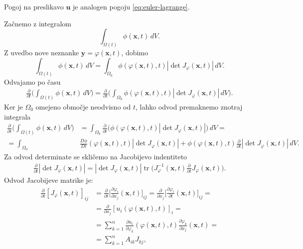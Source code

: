 \documentclass[mat2, tisk]{fmfdelo}
\newcommand{\bd}{\textbf}
\begin{document}
\begin{opomba}
Pogoj na preslikavo $\bd{u}$ je analogen pogoju \eqref{eq:euler-lagrange}.
\end{opomba}

\begin{dokaz}
Začnemo z integralom 
$$
\int_{\Omega(t)} \phi(\mathbf{x},t)\, dV.
$$
Z uvedbo nove neznanke $\bd{y} = \varphi(\bd{x}, t)$, dobimo 
$$
\int_{\Omega(t)} \phi(\mathbf{x},t)\, dV = \int_{\Omega_0} \phi(\varphi({\mathbf{x}},t), t) |\det{J_\varphi(\bd{x}, t)}| \, dV.
$$
Odvajamo po času 
\begin{align*}
\frac{\partial}{\partial t} \Big(\int_{\Omega(t)} \phi(\mathbf{x},t)\, dV\Big) = \frac{\partial}{\partial t} \Big(\int_{\Omega_0} \phi(\varphi({\mathbf{x}},t), t) |\det{J_\varphi(\bd{x}, t)}| \, dV \Big).
\end{align*}
Ker je $\Omega_0$ omejeno območje neodvisno od $t$, lahko odvod premaknemo 
znotraj integrala
\begin{align*}
\frac{\partial}{\partial t} \Big(\int_{\Omega(t)} \phi(\mathbf{x},t)\, dV\Big) &= \int_{\Omega_0} \frac{\partial}{\partial t} \Big(\phi(\varphi({\mathbf{x}},t), t) |\det{J_\varphi(\bd{x}, t)}|\Big) \, dV = \\
= \int_{\Omega_0} &\frac{D \phi}{D t}(\varphi(\bd{x}, t), t) |\det J_\varphi(\bd{x}, t)| + \phi(\varphi({\mathbf{x}},t), t) \frac{\partial}{\partial t} |\det{J_\varphi(\bd{x}, t)}| \, dV.
\end{align*}
Za odvod determinate se skličemo na Jacobijevo indentiteto 
\begin{align*}
\frac{\partial}{\partial t} |\det{J_\varphi(\bd{x}, t)}| = |\det{J_\varphi(\bd{x}, t)}| \operatorname{tr}\Big(J_\varphi^{-1}(\bd{x}, t) \frac{\partial}{\partial t} J_\varphi(\bd{x}, t)\Big).
\end{align*}
Odvod Jacobijeve matrike je:
\begin{align*}
\frac{\partial}{\partial t} [J_\varphi(\bd{x}, t)]_{ij} &= \frac{\partial}{\partial t} \Big[\frac{\partial \varphi_i}{\partial x_j}(\bd{x}, t)\Big]_{ij} = \frac{\partial}{\partial x_j} \Big[\frac{\partial \varphi_i}{\partial t}(\bd{x}, t)\Big]_{ij} = \\
&= \frac{\partial}{\partial x_j} [u_i(\varphi(\bd{x}, t), t)]_i = \\
&= \sum_{k=1}^n \frac{\partial u_i}{\partial \varphi_k}(\varphi(\bd{x}, t), t) \frac{\partial \varphi_k}{\partial x_j}(\bd{x}, t) = \\
&= \sum_{k=1}^n A_{ik} J_{kj},
\end{align*}

\end{dokaz}
\end{document}

